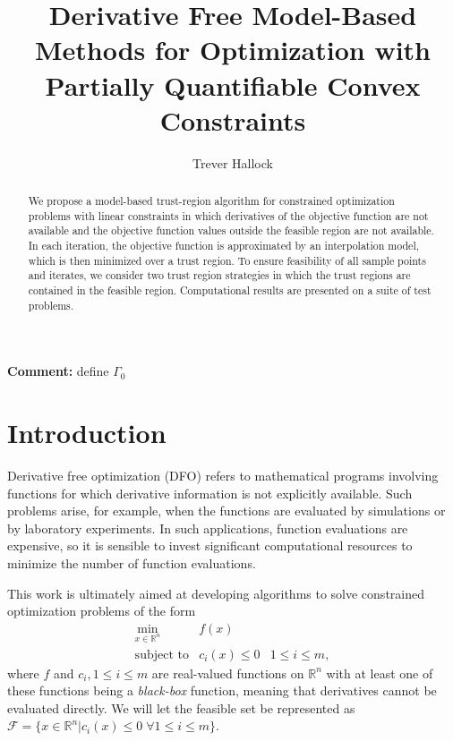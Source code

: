 \documentclass{article}
\title{Derivative Free Model-Based Methods for Optimization with Partially Quantifiable Convex Constraints}
\author{Trever Hallock}
\newenvironment{comment}
  {\par\medskip
   \color{red}%
   \begin{framed}
   \textbf{Comment: }\ignorespaces}
 {\end{framed}
  \medskip}
\theoremstyle{case}
\newcommand{\domain}{{\mathcal X}}
\newcommand{\Rn}{\mathbb R^n}
\newcommand{\feasible}{{\mathcal F}}
\newcommand{\huff}{{\Gamma_0}}
\begin{document}
\maketitle

\begin{abstract}

We propose a model-based trust-region algorithm for constrained optimization problems with linear constraints in which derivatives of the objective function are not available and the objective function values outside the feasible region are not available.
In each iteration, the objective function is approximated by an interpolation model, which is then minimized over a trust region.
To ensure feasibility of all sample points and iterates, we consider two trust region strategies in which the trust regions are contained in the feasible region.
Computational results are presented on a suite of test problems.

\end{abstract}

\newpage

\tableofcontents

\newpage


\begin{comment}
define $\huff$
\end{comment}

\section{Introduction}

Derivative free optimization (DFO) refers to mathematical programs involving functions for which derivative information is not explicitly available.
Such problems arise, for example, when the functions are evaluated by simulations or by laboratory experiments.
In such applications, function evaluations are expensive, so it is sensible to invest significant computational resources to minimize the number of function evaluations.

This work is ultimately aimed at developing algorithms to solve constrained optimization problems of the form 
\[ \begin{array}{ccl} \min_{x \in \Rn} & f(x) \\
\mbox{subject to} & c_i(x) \le 0 & 1 \le i \le m,
\end{array}
\]
where 
$f$ and $c_i, 1 \le i \le m$ are real-valued functions on $\Rn$ with at least one of these functions being a {\em black-box} function, meaning that derivatives cannot be evaluated directly.
We will let the feasible set be represented as $\feasible = \{x \in \Rn | c_i(x) \le 0 \; \forall 1 \le i \le m \}$.
\end{document}
